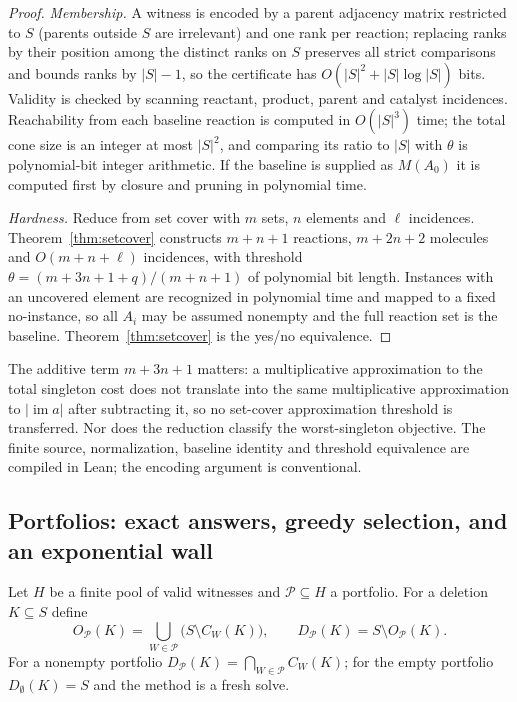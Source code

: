 \documentclass[11pt,a4paper]{article}
\theoremstyle{plain}
\theoremstyle{definition}
\theoremstyle{remark}
\DeclareMathOperator{\im}{im}
\begin{document}
\begin{proof}
\emph{Membership.} A witness is encoded by a parent adjacency matrix restricted to $S$ (parents outside $S$ are irrelevant) and one rank per reaction; replacing ranks by their position among the distinct ranks on $S$ preserves all strict comparisons and bounds ranks by $|S|-1$, so the certificate has $O(|S|^{2}+|S|\log|S|)$ bits. Validity is checked by scanning reactant, product, parent and catalyst incidences. Reachability from each baseline reaction is computed in $O(|S|^{3})$ time; the total cone size is an integer at most $|S|^{2}$, and comparing its ratio to $|S|$ with $\theta$ is polynomial-bit integer arithmetic. If the baseline is supplied as $M(A_0)$ it is computed first by closure and pruning in polynomial time.

\emph{Hardness.} Reduce from set cover \citep{karp1972} with $m$ sets, $n$ elements and $\ell$ incidences. Theorem~\ref{thm:setcover} constructs $m+n+1$ reactions, $m+2n+2$ molecules and $O(m+n+\ell)$ incidences, with threshold $\theta=(m+3n+1+q)/(m+n+1)$ of polynomial bit length. Instances with an uncovered element are recognized in polynomial time and mapped to a fixed no-instance, so all $A_i$ may be assumed nonempty and the full reaction set is the baseline. Theorem~\ref{thm:setcover} is the yes/no equivalence.
\end{proof}

The additive term $m+3n+1$ matters: a multiplicative approximation to the total singleton cost does not translate into the same multiplicative approximation to $|\im a|$ after subtracting it, so no set-cover approximation threshold \citep{feige1998} is transferred. Nor does the reduction classify the worst-singleton objective. The finite source, normalization, baseline identity and threshold equivalence are compiled in Lean; the encoding argument is conventional.

\subsection{Portfolios: exact answers, greedy selection, and an exponential wall}

Let $H$ be a finite pool of valid witnesses and $\mathcal P\subseteq H$ a portfolio. For a deletion $K\subseteq S$ define
\[
O_{\mathcal P}(K)=\bigcup_{W\in\mathcal P}\big(S\setminus C_W(K)\big),\qquad D_{\mathcal P}(K)=S\setminus O_{\mathcal P}(K).
\]
For a nonempty portfolio $D_{\mathcal P}(K)=\bigcap_{W\in\mathcal P}C_W(K)$; for the empty portfolio $D_\emptyset(K)=S$ and the method is a fresh solve.
\end{document}
